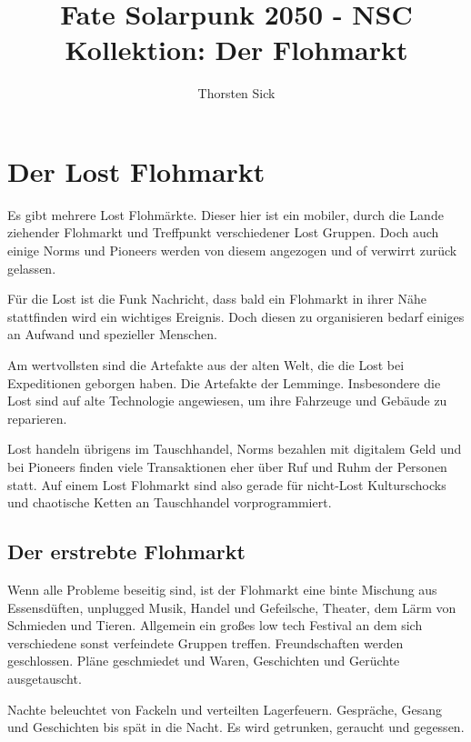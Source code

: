 \documentclass{book}
\title{Fate Solarpunk 2050 - NSC Kollektion: Der Flohmarkt}
\author{Thorsten Sick}
\begin{document}
%
%
\mbox{}
\thispagestyle{empty}
\BgThispage




\chapter{Der Lost Flohmarkt}

Es gibt mehrere Lost Flohmärkte. Dieser hier ist ein mobiler, durch die Lande ziehender Flohmarkt und Treffpunkt verschiedener Lost Gruppen. Doch auch einige Norms und Pioneers werden von diesem angezogen und of verwirrt zurück gelassen.

Für die Lost ist die Funk Nachricht, dass bald ein Flohmarkt in ihrer Nähe stattfinden wird ein wichtiges Ereignis. Doch diesen zu organisieren bedarf einiges an Aufwand und spezieller Menschen.

Am wertvollsten sind die Artefakte aus der alten Welt, die die Lost bei Expeditionen geborgen haben. Die Artefakte der Lemminge. Insbesondere die Lost sind auf alte Technologie angewiesen, um ihre Fahrzeuge und Gebäude zu reparieren.

Lost handeln übrigens im Tauschhandel, Norms bezahlen mit digitalem Geld und bei Pioneers finden viele Transaktionen eher über Ruf und Ruhm der Personen statt. Auf einem Lost Flohmarkt sind also gerade für nicht-Lost Kulturschocks und chaotische Ketten an Tauschhandel vorprogrammiert.

\section{Der erstrebte Flohmarkt}

Wenn alle Probleme beseitig sind, ist der Flohmarkt eine binte Mischung aus Essensdüften, unplugged Musik, Handel und Gefeilsche, Theater, dem Lärm von Schmieden und Tieren. Allgemein ein großes low tech Festival an dem sich verschiedene sonst verfeindete Gruppen treffen.
Freundschaften werden geschlossen. Pläne geschmiedet und Waren, Geschichten und Gerüchte ausgetauscht.

Nachte beleuchtet von Fackeln und verteilten Lagerfeuern. Gespräche, Gesang und Geschichten bis spät in die Nacht. Es wird getrunken, geraucht und gegessen.
\end{document}
